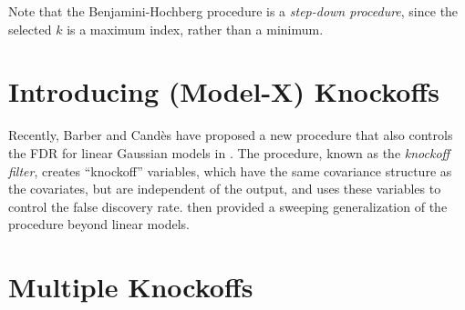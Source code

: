\documentclass[11pt,reqno]{report}
\theoremstyle{definition}
\numberwithin{equation}{section}
\begin{document}
Note that the Benjamini-Hochberg procedure is a \emph{step-down procedure}, since the selected $k$ is a maximum index, rather than a minimum. 


\chapter{Introducing (Model-X) Knockoffs}
\label{chapter2}
Recently, Barber and Cand\`{e}s have proposed a new procedure that also controls the FDR for linear Gaussian models in \cite{knockoffs}. The procedure, known as the \emph{knockoff filter}, creates ``knockoff'' variables, which have the same covariance structure as the covariates, but are independent of the output, and uses these variables to control the false discovery rate. \cite{panning} then provided a sweeping generalization of the procedure beyond linear models.


\chapter{Multiple Knockoffs}
\label{chapter3}
\end{document}
